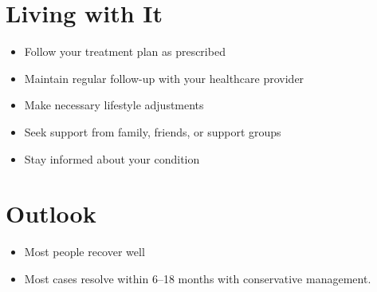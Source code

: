 \section{Living with It}
\begin{itemize}[noitemsep]
  \item Follow your treatment plan as prescribed
  \item Maintain regular follow-up with your healthcare provider
  \item Make necessary lifestyle adjustments
  \item Seek support from family, friends, or support groups
  \item Stay informed about your condition
\end{itemize}
\section{Outlook}
\begin{itemize}[noitemsep]
  \item Most people recover well
  \item Most cases resolve within 6--18 months with conservative management.
\end{itemize}
